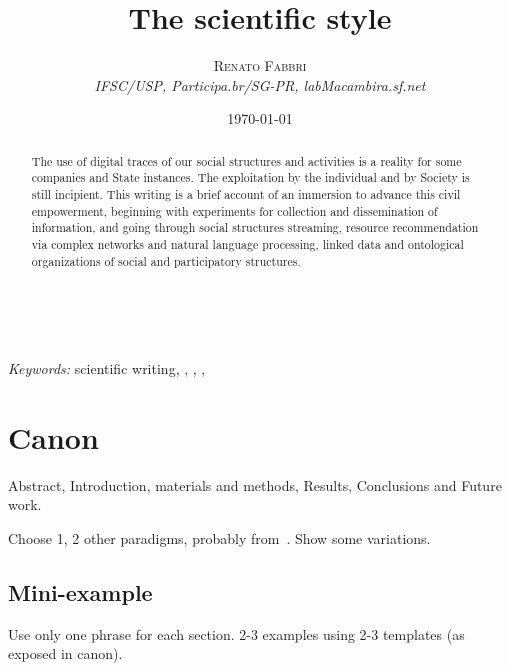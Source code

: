 \documentclass[a4paper, 11pt]{article} %
\title{\textbf{The scientific style}} %
\author{\textsc{Renato Fabbri} %
\\{\textit{IFSC/USP, Participa.br/SG-PR, labMacambira.sf.net}}} %
\date{\today} %
\makeatletter
\renewcommand{\maketitle}{ %
\begin{flushright} %
{\LARGE\@title} %

\vspace{50pt} %

{\large\@author} %
\\\@date %

\vspace{40pt} %
\end{flushright}
}
\makeatother
\begin{document}
\maketitle %




{
\begin{abstract}
The use of digital traces of our social structures and activities is a reality for some companies and State instances. The exploitation by the individual and by Society is still incipient. This writing is a brief account of an immersion to advance this civil empowerment, beginning with experiments for collection and dissemination of information, and going through social structures streaming, resource recommendation via complex networks and natural language processing, linked data and ontological organizations of social and participatory structures.
\end{abstract}
}



\hspace*{3,6mm}\textit{Keywords:} scientific writing, , , , %


\newpage
\tableofcontents


\section*{Canon}
Abstract, Introduction, materials and methods, Results, Conclusions and Future work.

Choose 1, 2 other paradigms, probably from~\cite{livro}. Show some variations.

\subsection*{Mini-example}
Use only one phrase for each section. 2-3 examples using 2-3 templates (as exposed in canon).
\end{document}
